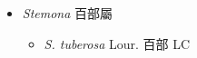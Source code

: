 
  \begin{itemize}
 \item[] \textit{Stemona} 百部屬
                                
  \begin{itemize}
        \item[] \textit{S. tuberosa} Lour.  百部   LC
  \end{itemize}
  \end{itemize}
